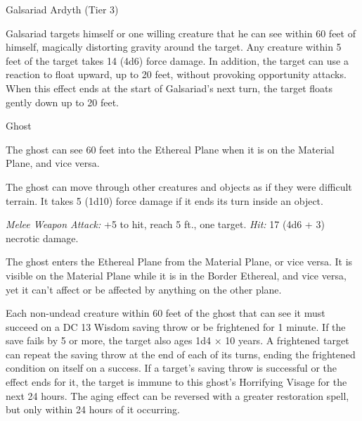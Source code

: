 \documentclass[10pt,a4paper,twoside,bg=none,twocolumn,openany,nodeprecatedcode]{dndbook}
\begin{document}
\begin{DndMonster}[float=t]{Galsariad Ardyth (Tier 3)}
\par
{}
Galsariad targets himself or one willing creature that he can see within 60 feet of himself, magically distorting gravity around the target. Any creature within 5 feet of the target takes 14 (4d6) force damage. In addition, the target can use a reaction to float upward, up to 20 feet, without provoking opportunity attacks. When this effect ends at the start of Galsariad's next turn, the target floats gently down up to 20 feet.

\end{DndMonster}



\begin{DndMonster}[float=t]{Ghost}
\DndMonsterBasics[
armor-class = {11},
hit-points = {\DndDice{10d8}},
speed = {0 ft., fly 40 ft. \textit{(hover)}}
]
\DndMonsterAbilityScores[
 str = 7,
 dex = 13,
 con = 10,
 int = 10,
 wis = 12,
 cha = 17
]
\DndMonsterDetails[
damage-resistances = {acid, fire, lightning, thunder; bludgeoning, piercing, slashing from nonmagical attacks},
damage-immunities = {cold, necrotic, poison},
senses = {darkvision 60 ft., passive perception 11},
languages = {any languages it knew in life},
challenge = 4,
]
The ghost can see 60 feet into the Ethereal Plane when it is on the Material Plane, and vice versa.

The ghost can move through other creatures and objects as if they were difficult terrain. It takes 5 (1d10) force damage if it ends its turn inside an object.

\par
{}
\textsl{Melee Weapon Attack:} +5 to hit, reach 5 ft., one target. \textsl{Hit:} 17 (4d6 + 3) necrotic damage.

The ghost enters the Ethereal Plane from the Material Plane, or vice versa. It is visible on the Material Plane while it is in the Border Ethereal, and vice versa, yet it can't affect or be affected by anything on the other plane.

Each non-undead creature within 60 feet of the ghost that can see it must succeed on a DC 13 Wisdom saving throw or be frightened for 1 minute. If the save fails by 5 or more, the target also ages 1d4 × 10 years. A frightened target can repeat the saving throw at the end of each of its turns, ending the frightened condition on itself on a success. If a target's saving throw is successful or the effect ends for it, the target is immune to this ghost's Horrifying Visage for the next 24 hours. The aging effect can be reversed with a  greater restoration spell, but only within 24 hours of it occurring.


\end{DndMonster}
\end{document}
